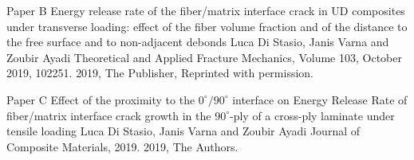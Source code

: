 \documentclass[12pt,a4paper,openright,final,twoside]{msethesis}
\begin{document}
\newrefsection
\makepaper
  {\paperheader}
  {\papertitle}
  {\paperauthorstring}
  {}
  {\copyrightstring}




\def\paperheader{Paper B}
\def\papertitle{Energy release rate of the fiber/matrix interface crack in UD composites under transverse loading: effect of the fiber volume fraction and of the distance to the free surface and to non-adjacent debonds}
\def\paperauthorstring{Luca Di Stasio, Janis Varna and Zoubir Ayadi}
\def\referencestring{Theoretical and Applied Fracture Mechanics, Volume 103, October 2019, 102251.}
\def\copyrightstring{2019, The Publisher, Reprinted with permission.}


\newrefsection
\makepaper
  {\paperheader}
  {\papertitle}
  {\paperauthorstring}
  {\referencestring}
  {\copyrightstring}



\def\paperheader{Paper C}
\def\papertitle{Effect of the proximity to the $0^{\circ}/90^{\circ}$ interface on Energy Release Rate of fiber/matrix interface crack growth in the  $90^{\circ}$-ply of a cross-ply laminate under tensile loading}
\def\paperauthorstring{Luca Di Stasio, Janis Varna and Zoubir Ayadi}
\def\referencestring{Journal of Composite Materials, 2019.}
\def\copyrightstring{2019, The Authors.}

\newrefsection
\makepapersubmitted
  {\paperheader}
  {\papertitle}
  {\paperauthorstring}
  {\referencestring}
  {\copyrightstring}




\def\paperheader{Paper D}
\def\papertitle{Growth of interface cracks on consecutive fibers: on the same or on the opposite sides?}
\def\paperauthorstring{Luca Di Stasio, Janis Varna and Zoubir Ayadi}
\def\referencestring{Proceedings of the 12$^{th}$ International Conference on Composite Science and Technology (ICCST 12), Materials Today: Proceedings, 2019.}
\def\copyrightstring{2019, The Authors.}
\end{document}
